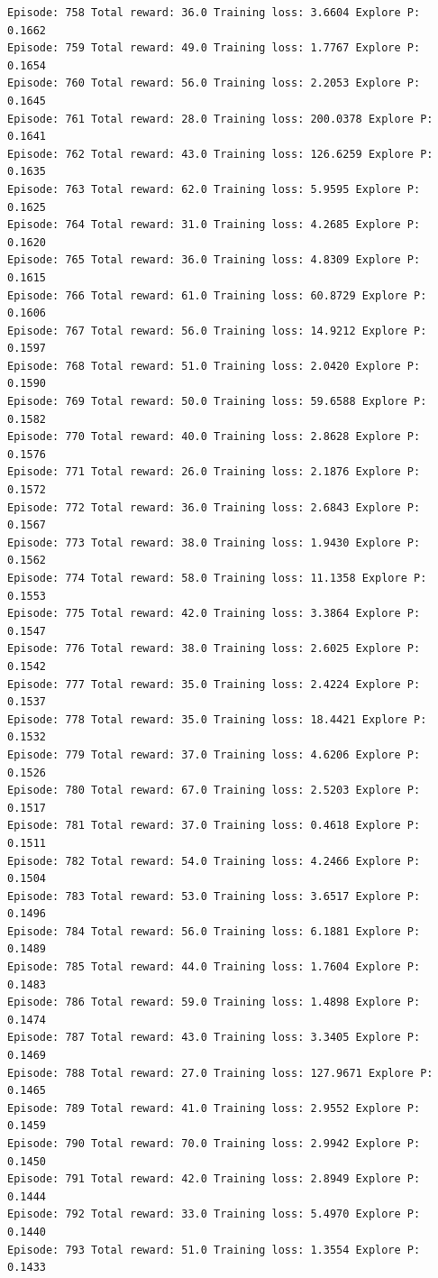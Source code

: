 \documentclass[11pt]{article}
\begin{document}
\begin{Verbatim}[commandchars=\\\{\}]
Episode: 758 Total reward: 36.0 Training loss: 3.6604 Explore P: 0.1662
Episode: 759 Total reward: 49.0 Training loss: 1.7767 Explore P: 0.1654
Episode: 760 Total reward: 56.0 Training loss: 2.2053 Explore P: 0.1645
Episode: 761 Total reward: 28.0 Training loss: 200.0378 Explore P: 0.1641
Episode: 762 Total reward: 43.0 Training loss: 126.6259 Explore P: 0.1635
Episode: 763 Total reward: 62.0 Training loss: 5.9595 Explore P: 0.1625
Episode: 764 Total reward: 31.0 Training loss: 4.2685 Explore P: 0.1620
Episode: 765 Total reward: 36.0 Training loss: 4.8309 Explore P: 0.1615
Episode: 766 Total reward: 61.0 Training loss: 60.8729 Explore P: 0.1606
Episode: 767 Total reward: 56.0 Training loss: 14.9212 Explore P: 0.1597
Episode: 768 Total reward: 51.0 Training loss: 2.0420 Explore P: 0.1590
Episode: 769 Total reward: 50.0 Training loss: 59.6588 Explore P: 0.1582
Episode: 770 Total reward: 40.0 Training loss: 2.8628 Explore P: 0.1576
Episode: 771 Total reward: 26.0 Training loss: 2.1876 Explore P: 0.1572
Episode: 772 Total reward: 36.0 Training loss: 2.6843 Explore P: 0.1567
Episode: 773 Total reward: 38.0 Training loss: 1.9430 Explore P: 0.1562
Episode: 774 Total reward: 58.0 Training loss: 11.1358 Explore P: 0.1553
Episode: 775 Total reward: 42.0 Training loss: 3.3864 Explore P: 0.1547
Episode: 776 Total reward: 38.0 Training loss: 2.6025 Explore P: 0.1542
Episode: 777 Total reward: 35.0 Training loss: 2.4224 Explore P: 0.1537
Episode: 778 Total reward: 35.0 Training loss: 18.4421 Explore P: 0.1532
Episode: 779 Total reward: 37.0 Training loss: 4.6206 Explore P: 0.1526
Episode: 780 Total reward: 67.0 Training loss: 2.5203 Explore P: 0.1517
Episode: 781 Total reward: 37.0 Training loss: 0.4618 Explore P: 0.1511
Episode: 782 Total reward: 54.0 Training loss: 4.2466 Explore P: 0.1504
Episode: 783 Total reward: 53.0 Training loss: 3.6517 Explore P: 0.1496
Episode: 784 Total reward: 56.0 Training loss: 6.1881 Explore P: 0.1489
Episode: 785 Total reward: 44.0 Training loss: 1.7604 Explore P: 0.1483
Episode: 786 Total reward: 59.0 Training loss: 1.4898 Explore P: 0.1474
Episode: 787 Total reward: 43.0 Training loss: 3.3405 Explore P: 0.1469
Episode: 788 Total reward: 27.0 Training loss: 127.9671 Explore P: 0.1465
Episode: 789 Total reward: 41.0 Training loss: 2.9552 Explore P: 0.1459
Episode: 790 Total reward: 70.0 Training loss: 2.9942 Explore P: 0.1450
Episode: 791 Total reward: 42.0 Training loss: 2.8949 Explore P: 0.1444
Episode: 792 Total reward: 33.0 Training loss: 5.4970 Explore P: 0.1440
Episode: 793 Total reward: 51.0 Training loss: 1.3554 Explore P: 0.1433

\end{Verbatim}
\end{document}
